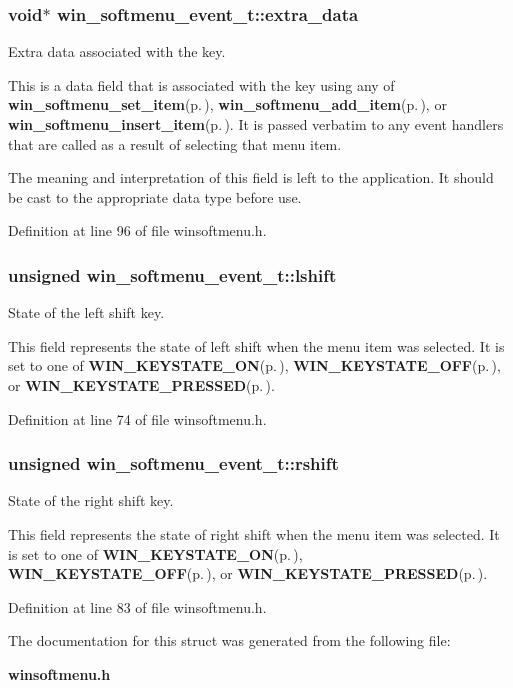\subsubsection{\setlength{\rightskip}{0pt plus 5cm}void$\ast$ {\bf win\_\-softmenu\_\-event\_\-t::extra\_\-data}}\label{structwin__softmenu__event__t_o2}


Extra data associated with the key. 

This is a data field that is associated with the key using any of {\bf win\_\-softmenu\_\-set\_\-item}{\rm (p.\,\pageref{winsoftmenu_8h_a2})}, {\bf win\_\-softmenu\_\-add\_\-item}{\rm (p.\,\pageref{winsoftmenu_8h_a3})}, or {\bf win\_\-softmenu\_\-insert\_\-item}{\rm (p.\,\pageref{winsoftmenu_8h_a4})}. It is passed verbatim to any event handlers that are called as a result of selecting that menu item.

The meaning and interpretation of this field is left to the application. It should be cast to the appropriate data type before use. 

Definition at line 96 of file winsoftmenu.h.
\subsubsection{\setlength{\rightskip}{0pt plus 5cm}unsigned {\bf win\_\-softmenu\_\-event\_\-t::lshift}}\label{structwin__softmenu__event__t_o0}


State of the left shift key. 

This field represents the state of left shift when the menu item was selected. It is set to one of {\bf WIN\_\-KEYSTATE\_\-ON}{\rm (p.\,\pageref{winkeys_8h_a7})}, {\bf WIN\_\-KEYSTATE\_\-OFF}{\rm (p.\,\pageref{winkeys_8h_a6})}, or {\bf WIN\_\-KEYSTATE\_\-PRESSED}{\rm (p.\,\pageref{winkeys_8h_a9})}. 

Definition at line 74 of file winsoftmenu.h.
\subsubsection{\setlength{\rightskip}{0pt plus 5cm}unsigned {\bf win\_\-softmenu\_\-event\_\-t::rshift}}\label{structwin__softmenu__event__t_o1}


State of the right shift key. 

This field represents the state of right shift when the menu item was selected. It is set to one of {\bf WIN\_\-KEYSTATE\_\-ON}{\rm (p.\,\pageref{winkeys_8h_a7})}, {\bf WIN\_\-KEYSTATE\_\-OFF}{\rm (p.\,\pageref{winkeys_8h_a6})}, or {\bf WIN\_\-KEYSTATE\_\-PRESSED}{\rm (p.\,\pageref{winkeys_8h_a9})}. 

Definition at line 83 of file winsoftmenu.h.

The documentation for this struct was generated from the following file:\begin{CompactItemize}
\item 
{\bf winsoftmenu.h}\end{CompactItemize}
